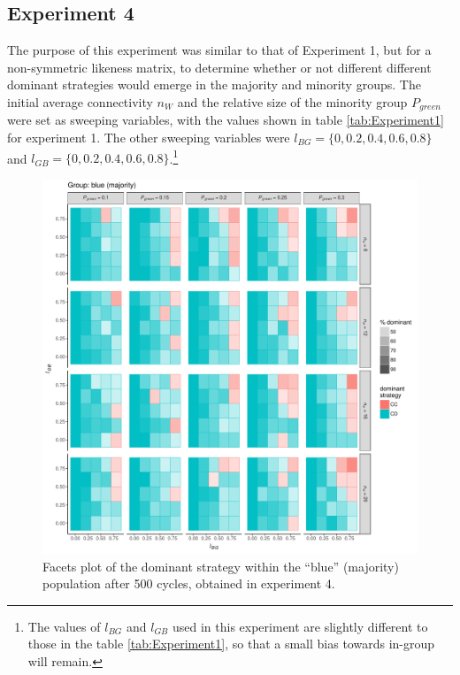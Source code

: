\subsection{Experiment 4}
The purpose of this experiment was similar to that of Experiment 1, but for a non-symmetric likeness matrix, to determine whether or not different different dominant strategies would emerge in the majority and minority groups. The initial average connectivity $ n_W $ and the relative size of the minority group $ P_{green} $ were set as sweeping variables, with the values shown in table \ref{tab:Experiment1} for experiment 1. The other sweeping variables were $ l_{BG} = \{0,0.2,0.4,0.6,0.8\} $ and $ l_{GB} = \{0,0.2,0.4,0.6,0.8\} $.\footnote{The values of $ l_{BG} $ and $ l_{GB} $ used in this experiment are slightly different to those in the table \ref{tab:Experiment1}, so that a small bias towards in-group will remain.}
\begin{figure}[t!]
	\label{fig:strategyHostExperiment4}
	\begin{minipage}[c]{0.2\linewidth}
		\caption{Facets plot of the dominant strategy within the ``blue'' (majority) population after 500 cycles, obtained in experiment 4.}
	\end{minipage}
	\begin{minipage}[c]{0.75\linewidth}
		\includegraphics[trim={0cm 0cm 0.4cm 0cm}, clip, width=\linewidth]{figures/strategyHostExperiment4.pdf}
	\end{minipage}
\end{figure}


